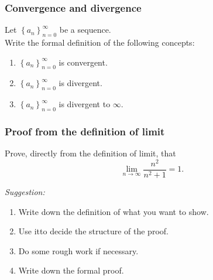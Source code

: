 \begin{frame}[t]
	\frametitle{Convergence and divergence}

	Let $\displaystyle \left\{ a_{n} \right\}_{n=0}^{\infty}$ be a sequence. \\ Write
	the formal definition of the following concepts:

	\begin{enumerate}
		\item $\displaystyle \left\{ a_{n} \right\}_{n=0}^{\infty}$ is convergent.

			\vfill

		\item $\displaystyle \left\{ a_{n} \right\}_{n=0}^{\infty}$ is divergent.

			\vfill

		\item $\displaystyle \left\{ a_{n} \right\}_{n=0}^{\infty}$ is divergent to $\infty$.

			\vfill
	\end{enumerate}
\end{frame}

\begin{frame}[t]
	\frametitle{Proof from the definition of limit}

	Prove, directly from the definition of limit, that
	\[
		\lim_{n \to \infty}\frac{n^{2}}{n^{2}+1}= 1.
	\]

	\emph{Suggestion:}
	\begin{enumerate}
		\item Write down the definition of what you want to show.

		\item Use itto decide the structure of the proof.

		\item Do some rough work if necessary.

		\item Write down the formal proof.
	\end{enumerate}
\end{frame}

